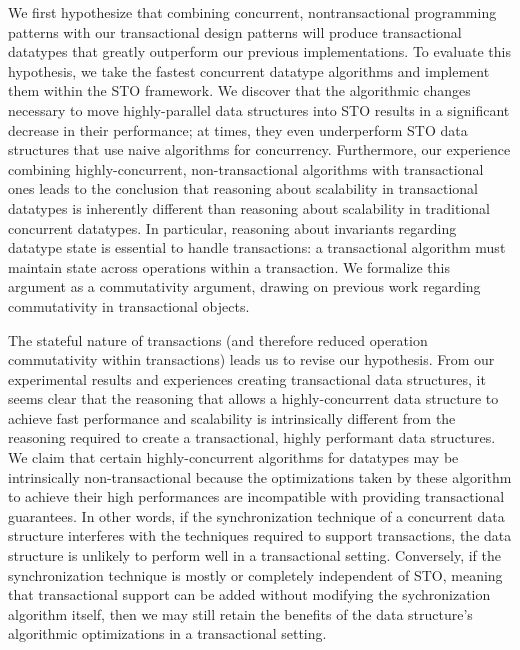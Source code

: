 We first hypothesize that combining concurrent, nontransactional programming patterns with our transactional design patterns will produce transactional datatypes that greatly outperform our previous implementations. To evaluate this hypothesis, we take the fastest concurrent datatype algorithms and implement them within the STO framework. We discover that the algorithmic changes necessary to move highly-parallel data structures into STO results in a significant decrease in their performance; at times, they even underperform STO data structures that use naive algorithms for concurrency.
Furthermore, our experience combining highly-concurrent, non-transactional algorithms with transactional ones leads to the conclusion that reasoning about scalability in transactional datatypes is inherently different than reasoning about scalability in traditional concurrent datatypes. In particular, reasoning about invariants regarding datatype state is essential to handle transactions: a transactional algorithm must maintain state across operations within a transaction. We formalize this argument as a commutativity argument, drawing on previous work regarding commutativity in transactional objects\cite{weihl}.

The stateful nature of transactions (and therefore reduced operation commutativity within transactions) leads us to revise our hypothesis. From our experimental results and experiences creating transactional data structures, it seems clear that the reasoning that allows a highly-concurrent data structure to achieve fast performance and scalability is intrinsically different from the reasoning required to create a transactional, highly performant data structures. 
We claim that certain highly-concurrent algorithms for datatypes may be intrinsically non-transactional because the optimizations taken by these algorithm to achieve their high performances are incompatible with providing transactional guarantees. In other words, if the synchronization technique of a concurrent data structure interferes with the techniques required to support transactions, the data structure is unlikely to perform well in a transactional setting. Conversely, if the synchronization technique is mostly or completely independent of STO, meaning that transactional support can be added without modifying the sychronization algorithm itself, then we may still retain the benefits of the data structure's algorithmic optimizations in a transactional setting.


